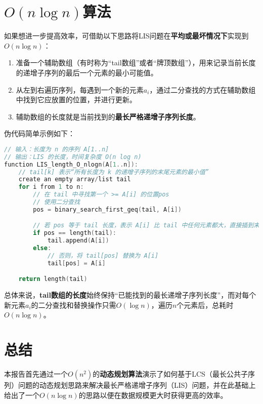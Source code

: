 \documentclass[UTF8]{ctexart}
\begin{document}
\section{\texorpdfstring{$O(n \log n)$}{O(n log n)}算法}
如果想进一步提高效率，可借助以下思路将LIS问题在\textbf{平均或最坏情况下}实现到$O(n \log n)$：
\begin{enumerate}
    \item 准备一个辅助数组（有时称为“tail数组”或者“牌顶数组”），用来记录当前长度的递增子序列的最后一个元素的最小可能值。
    \item 从左到右遍历序列，每遇到一个新的元素$a_i$，通过二分查找的方式在辅助数组中找到它应放置的位置，并进行更新。
    \item 辅助数组的长度就是当前找到的\textbf{最长严格递增子序列长度}。
\end{enumerate}

伪代码简单示例如下：
\begin{lstlisting}[language=C]
// 输入：长度为 n 的序列 A[1..n]
// 输出：LIS 的长度，时间复杂度 O(n log n)
function LIS_length_O_nlogn(A[1..n]):
    // tail[k] 表示“所有长度为 k 的递增子序列的末尾元素的最小值”
    create an empty array/list tail
    for i from 1 to n:
        // 在 tail 中寻找第一个 >= A[i] 的位置pos
        // 使用二分查找
        pos = binary_search_first_geq(tail, A[i])

        // 若 pos 等于 tail 长度，表示 A[i] 比 tail 中任何元素都大，直接插到末尾
        if pos == length(tail):
            tail.append(A[i])
        else:
            // 否则，将 tail[pos] 替换为 A[i]
            tail[pos] = A[i]

    return length(tail)
\end{lstlisting}

总体来说，\textbf{tail数组的长度}始终保持“已能找到的最长递增子序列长度”，而对每个新元素$a_i$的二分查找和替换操作只需$O(\log n)$，遍历$n$个元素后，总耗时$O(n \log n)$。

\section{总结}
本报告首先通过一个$O(n^2)$的\textbf{动态规划算法}演示了如何基于LCS（最长公共子序列）问题的动态规划思路来解决最长严格递增子序列（LIS）问题，并在此基础上给出了一个$O(n \log n)$的思路以便在数据规模更大时获得更高的效率。  
\end{document}
